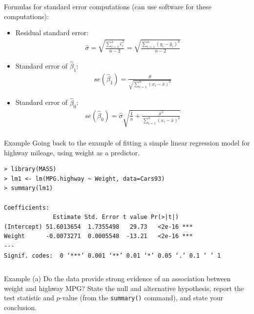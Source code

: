 \documentclass[10pt]{beamer}
\begin{document}
\begin{frame}
Formulas for standard error computations (can use software for these computations):\\
\vspace{5pt}

\begin{itemize}
\item Residual standard error:
\begin{align*}
\hat{\sigma} = \sqrt{\frac{\sum_{i=1}^n \hat{e}_i^2}{n-2}} = \sqrt{\frac{\sum_{i=1}^n (y_i - \hat{y}_i)^2}{n-2}}
\end{align*}
\item Standard error of $\hat{\beta}_1$:
\begin{align*}
se(\hat{\beta}_1) = \frac{\hat{\sigma}}{\sqrt{\sum_{i=1}^n (x_i - \bar{x})^2}}
\end{align*}
\item Standard error of $\hat{\beta}_0$:
\begin{align*}
se(\hat{\beta}_0) = \hat{\sigma} \sqrt{\frac{1}{n} + \frac{\bar{x}^2}{\sum_{i=1}^n (x_i - \bar{x})^2}}\\
\end{align*}
\end{itemize}
\end{frame}

\begin{frame}[fragile]{Example}
Going back to the example of fitting a simple linear regression model for highway mileage, using weight as a predictor.
\begin{verbatim}
> library(MASS)
> lm1 <- lm(MPG.highway ~ Weight, data=Cars93)
> summary(lm1)

Coefficients:
              Estimate Std. Error t value Pr(>|t|)    
(Intercept) 51.6013654  1.7355498   29.73   <2e-16 ***
Weight      -0.0073271  0.0005548  -13.21   <2e-16 ***
---
Signif. codes:  0 ‘***’ 0.001 ‘**’ 0.01 ‘*’ 0.05 ‘.’ 0.1 ‘ ’ 1
\end{verbatim}
\begin{verbatim}

\end{verbatim}
\end{frame}

\begin{frame}{Example}
\vspace{-3.5cm}
(a) Do the data provide strong evidence of an association between weight and highway MPG?  State the null and alternative hypothesis, report the test statistic and $p$-value (from the \texttt{summary()} command), and state your conclusion.\\
% 
% 
% 

\end{frame}
\end{document}
